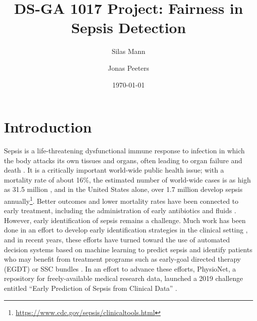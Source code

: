 \documentclass[10pt,letterpaper]{article}
\author{Silas Mann \and Jonas Peeters}
\title{DS-GA 1017 Project: Fairness in Sepsis Detection}
\date{\today}
\begin{document}
\maketitle
\vspace*{-1cm}




\section*{Introduction}
\par Sepsis is a life-threatening dysfunctional immune response to infection in which the body attacks its own tissues and organs, often leading to organ failure and death \cite{Singer2016}. It is a critically important world-wide public health issue; with a mortality rate of about 16\%, the estimated number of world-wide cases is as high as 31.5 million \cite{Fleischmann2016}, and in the United States alone, over 1.7 million develop sepsis annually\footnote{\href{https://www.cdc.gov/sepsis/clinicaltools/index.html?CDC_AA_refVal=https\%3A\%2F\%2Fwww.cdc.gov\%2Fsepsis\%2Fdatareports\%2Findex.html}{https://www.cdc.gov/sepsis/clinicaltools.html}}. Better outcomes and lower mortality rates have been connected to early treatment, including the administration of early antibiotics and fluids \cite{Rhee2018}. However, early identification of sepsis remains a challenge. Much work has been done in an effort to develop early identification strategies in the clinical setting \cite{Kim2019}, and in recent years, these efforts have turned toward the use of automated decision systems based on machine learning to predict sepsis \cite{Fleuren2020} and identify patients who may benefit from treatment programs such as early-goal directed therapy (EGDT) or SSC bundles \cite{Kim2019}. In an effort to advance these efforts, PhysioNet, a repository for freely-available medical research data, launched a 2019 challenge entitled “Early Prediction of Sepsis from Clinical Data” \cite{Reyna2019}.
\end{document}
